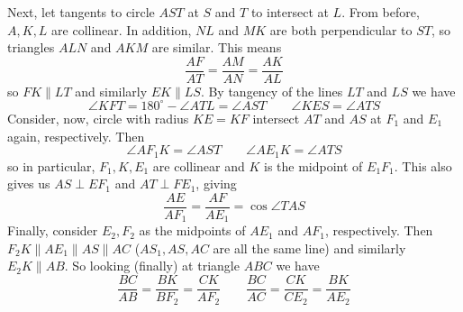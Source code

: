 \documentclass[11pt,a4paper]{article}
\begin{document}
\begin{enumerate}
	Next, let tangents to circle $AST$ at $S$ and $T$ to intersect at $L$. 
	From before, $A, K, L$ are collinear. 
	In addition, $NL$ and $MK$ are both perpendicular to $ST$, 
	so triangles $ALN$ and $AKM$ are similar. This means 
	\[
	\frac{AF}{AT}=\frac{AM}{AN} = \frac{AK}{AL}
	\]
	so $FK\parallel LT$ and similarly $EK\parallel LS$. 
	By tangency of the lines $LT$ and $LS$ we have 
	\[
	\angle KFT = 180^{\circ} - \angle ATL = \angle AST
	\qquad 
	\angle KES = \angle ATS
	\]
	Consider, now, circle with radius $KE=KF$ intersect $AT$ and $AS$ at 
	$F_1$ and $E_1$ again, respectively. 
	Then 
	\[
	\angle AF_1K = \angle AST\qquad \angle AE_1K = \angle ATS
	\]
	so in particular, $F_1, K, E_1$ are collinear and $K$ is the midpoint of $E_1F_1$. 
	This also gives us $AS\perp EF_1$ and $AT\perp FE_1$, giving 
	\[
	\frac{AE}{AF_1}=\frac{AF}{AE_1}=\cos \angle TAS
	\]
	Finally, consider $E_2, F_2$ as the midpoints of $AE_1$ and $AF_1$, respectively. 
	Then $F_2K\parallel AE_1\parallel AS\parallel AC$ ($AS_1, AS, AC$ are all the same line) 
	and similarly $E_2K\parallel AB$. 
	So looking (finally) at triangle $ABC$ we have 
	\[
	\frac{BC}{AB} = \frac{BK}{BF_2} = \frac{CK}{AF_2}
	\qquad 
	\frac{BC}{AC} = \frac{CK}{CE_2} = \frac{BK}{AE_2}
	\]
	

\end{enumerate}
\end{document}
